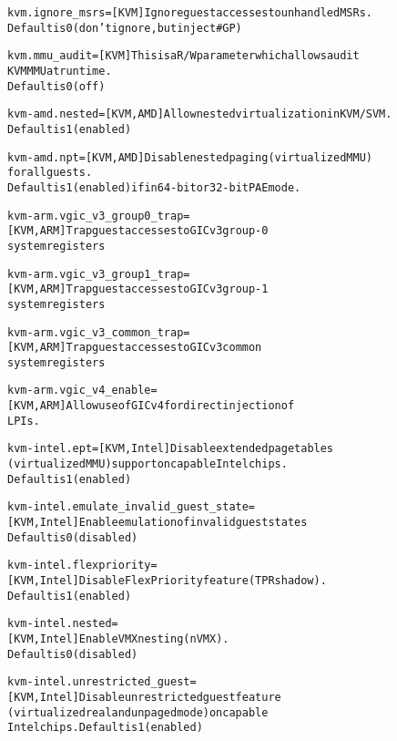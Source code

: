 \documentclass[a4paper,8pt,english]{sphinxmanual}
\begin{document}
\begin{alltt}
        kvm.ignore\_msrs={[}KVM{]} Ignore guest accesses to unhandled MSRs.
                        Default is 0 (don't ignore, but inject \#GP)

        kvm.mmu\_audit=  {[}KVM{]} This is a R/W parameter which allows audit
                        KVM MMU at runtime.
                        Default is 0 (off)

        kvm-amd.nested= {[}KVM,AMD{]} Allow nested virtualization in KVM/SVM.
                        Default is 1 (enabled)

        kvm-amd.npt=    {[}KVM,AMD{]} Disable nested paging (virtualized MMU)
                        for all guests.
                        Default is 1 (enabled) if in 64-bit or 32-bit PAE mode.

        kvm-arm.vgic\_v3\_group0\_trap=
                        {[}KVM,ARM{]} Trap guest accesses to GICv3 group-0
                        system registers

        kvm-arm.vgic\_v3\_group1\_trap=
                        {[}KVM,ARM{]} Trap guest accesses to GICv3 group-1
                        system registers

        kvm-arm.vgic\_v3\_common\_trap=
                        {[}KVM,ARM{]} Trap guest accesses to GICv3 common
                        system registers

        kvm-arm.vgic\_v4\_enable=
                        {[}KVM,ARM{]} Allow use of GICv4 for direct injection of
                        LPIs.

        kvm-intel.ept=  {[}KVM,Intel{]} Disable extended page tables
                        (virtualized MMU) support on capable Intel chips.
                        Default is 1 (enabled)

        kvm-intel.emulate\_invalid\_guest\_state=
                        {[}KVM,Intel{]} Enable emulation of invalid guest states
                        Default is 0 (disabled)

        kvm-intel.flexpriority=
                        {[}KVM,Intel{]} Disable FlexPriority feature (TPR shadow).
                        Default is 1 (enabled)

        kvm-intel.nested=
                        {[}KVM,Intel{]} Enable VMX nesting (nVMX).
                        Default is 0 (disabled)

        kvm-intel.unrestricted\_guest=
                        {[}KVM,Intel{]} Disable unrestricted guest feature
                        (virtualized real and unpaged mode) on capable
                        Intel chips. Default is 1 (enabled)


\end{alltt}
\end{document}
